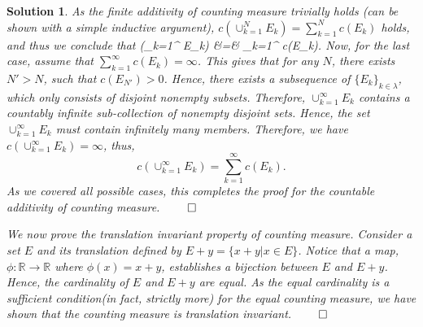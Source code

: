 \documentclass{article} %
\def\eQb#1\eQe{\begin{eqnarray*}#1\end{eqnarray*}}
\theoremstyle{quest}
\newtheorem*{solution}{Solution}
\begin{document}
\begin{solution}
\pagebreak

As the finite additivity of counting measure trivially holds (can be shown
with a simple inductive argument),
$c(\cup_{k=1}^{N} E_k) = \sum_{k=1}^{N} c(E_k)$ holds, and thus we conclude that
\eQb
c(\cup_{k=1}^{\infty} E_k) &=& \sum_{k=1}^{\infty} c(E_k).
\eQe
Now, for the last case, assume that $\sum_{k=1}^{\infty} c(E_k ) = \infty$. This gives that
for any $N$, there exists $N' > N$, such that $c(E_{N'}) > 0$. Hence, there exists a subsequence
of $\{ E_k \}_{k \in \lambda}$, 
which only consists of disjoint nonempty subsets. 
Therefore, $\cup_{k=1}^{\infty} E_k$ contains a countably infinite
sub-collection of nonempty disjoint sets. Hence,  
the set $\cup_{k=1}^{\infty} E_k$ must contain infinitely many members. Therefore, we have
$c(\cup_{k=1}^{\infty} E_k) = \infty$, thus,
\[
c(\cup_{k=1}^{\infty} E_k) = \sum_{k=1}^{\infty} c(E_k).
\]
As we covered all possible cases, this completes the proof for the countable additivity of 
counting measure. $\qed$
\\
\smallskip

We now prove the translation invariant property of counting measure. Consider a set $E$ and its 
translation defined by $E+y = \{ x + y | x \in E \}$. Notice that 
a map, $\phi:\mathbb{R} \to \mathbb{R}$ where $\phi(x) = x+y$, establishes a bijection
between $E$ and $E+y$. Hence, the cardinality
of $E$ and $E+y$ are equal. As the equal cardinality is a sufficient condition(in fact, strictly more) 
for the equal counting measure, we have shown that the counting measure
is translation invariant. $\qed$


\end{solution}


\bigskip
\end{document}
